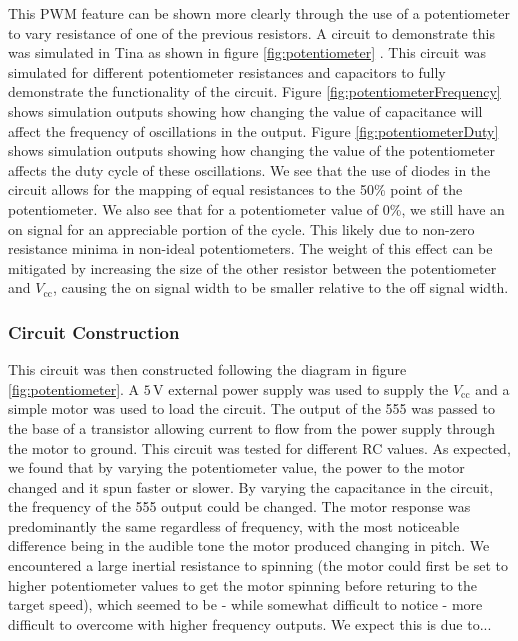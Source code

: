 \documentclass[%
 reprint,
 amsmath,amssymb,
 aps,
]{revtex4-2}
\begin{document}
        This PWM feature can be shown more clearly through the use of a potentiometer to vary resistance of one of the previous resistors. A circuit to demonstrate this was simulated in Tina as shown in figure \ref{fig:potentiometer} \cite{tina}. This circuit was simulated for different potentiometer resistances and capacitors to fully demonstrate the functionality of the circuit. Figure \ref{fig:potentiometerFrequency} shows simulation outputs showing how changing the value of capacitance will affect the frequency of oscillations in the output. Figure \ref{fig:potentiometerDuty} shows simulation outputs showing how changing the value of the potentiometer affects the duty cycle of these oscillations. We see that the use of diodes in the circuit allows for the mapping of equal resistances to the 50\% point of the potentiometer. We also see that for a potentiometer value of 0\%, we still have an on signal for an appreciable portion of the cycle. This likely due to non-zero resistance minima in non-ideal potentiometers. The weight of this effect can be mitigated by increasing the size of the other resistor between the potentiometer and $V_\text{cc}$, causing the on signal width to be smaller relative to the off signal width.


        \subsubsection{Circuit Construction}
        This circuit was then constructed following the diagram in figure \ref{fig:potentiometer}. A $5\,\text{V}$ external power supply was used to supply the $V_\text{cc}$ and a simple motor was used to load the circuit. The output of the 555 was passed to the base of a transistor allowing current to flow from the power supply through the motor to ground. This circuit was tested for different RC values. As expected, we found that by varying the potentiometer value, the power to the motor changed and it spun faster or slower. By varying the capacitance in the circuit, the frequency of the 555 output could be changed. The motor response was predominantly the same regardless of frequency, with the most noticeable difference being in the audible tone the motor produced changing in pitch. We encountered a large inertial resistance to spinning (the motor could first be set to higher potentiometer values to get the motor spinning before returing to the target speed), which seemed to be - while somewhat difficult to notice - more difficult to overcome with higher frequency outputs. We expect this is due to...
\end{document}
